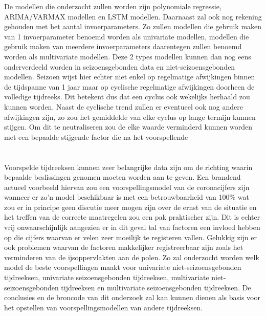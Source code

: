 De modellen die onderzocht zullen worden zijn polynomiale regressie, ARIMA/VARMAX modellen en LSTM modellen. Daarnaast zal ook nog rekening gehouden met het aantal invoerparameters. Zo zullen modellen die gebruik maken van 1 invoerparameter benoemd worden als univariate modellen, modellen die gebruik maken van meerdere invoerparameters daarentegen zullen benoemd worden als multivariate modellen. Deze 2 types modellen kunnen dan nog eens onderverdeeld worden in seizoensgebonden data en niet-seizoensgebonden modellen. Seizoen wijst hier echter niet enkel op regelmatige afwijkingen binnen de tijdspanne van 1 jaar maar op cyclische regelmatige afwijkingen doorheen de volledige tijdreeks. Dit betekent dus dat een cyclus ook wekelijks herhaald zou kunnen worden. Naast de cyclische trend zullen er eventueel ook nog andere afwijkingen zijn, zo zou het gemiddelde van elke cyclus op lange termijn kunnen stijgen. Om dit te neutraliseren zou de elke waarde verminderd kunnen worden met een bepaalde stijgende factor die na het voorspellende 

\section{}
\label{sec:probleemstelling}

Voorspelde tijdreeksen kunnen zeer belangrijke data zijn om de richting waarin bepaalde beslissingen genomen moeten worden aan te geven. Een brandend actueel voorbeeld hiervan zou een voorspellingsmodel van de coronacijfers zijn wanneer er zo'n model beschikbaar is met een betrouwbaarheid van 100\% wat zou er in principe geen discutie meer mogen zijn over de ernst van de situatie en het treffen van de correcte maatregelen zou een pak praktischer zijn. Dit is echter vrij onwaarschijnlijk aangezien er in dit geval tal van factoren een invloed hebben op die cijfers waarvan er velen zeer moeilijk te registeren vallen. 
Gelukkig zijn er ook problemen waarvan de factoren makkelijker registreerbaar zijn zoals het verminderen van de ijsoppervlakten aan de polen. Zo zal onderzocht worden welk model de beste voorspellingen maakt voor univariate niet-seizoensgebonden tijdreeksen, univariate seizoensgebonden tijdreeksen, multivariate niet-seizoensgebonden tijdreeksen en multivariate seizoensgebonden tijdreeksen. De conclusies en de broncode van dit onderzoek zal kan kunnen dienen als basis voor het opstellen van voorspellingsmodellen van andere tijdreeksen.


\section{}
\label{sec:onderzoeksvraag}

